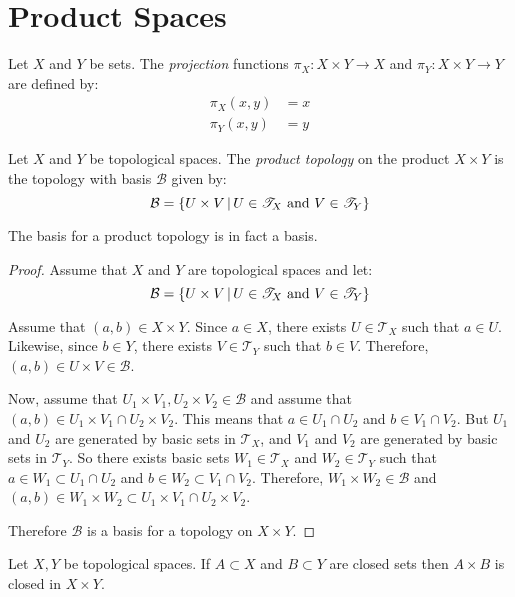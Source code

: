 \documentclass[letterpaper,12pt,fleqn]{article}
\newcommand{\p}{\pi}
\newcommand{\B}{\mathcal{B}}
\newcommand{\T}{\mathscr{T}}
\begin{document}
\section*{Product Spaces}

\begin{definition}[Projection]
  Let \(X\) and \(Y\) be sets.  The \emph{projection} functions \(\p_X:X\times Y\to X\) and \(\p_Y:X\times Y\to Y\)
  are defined by:
  \begin{align*}
    \p_X(x,y) &= x \\
    \p_Y(x,y) &= y
  \end{align*}
\end{definition}

\begin{definition}
  Let \(X\) and \(Y\) be topological spaces.  The \emph{product topology} on the product \(X\times Y\) is the
  topology with basis \(\B\) given by:
  \[\B=\setb{U\times V}{U\in\T_X\ \text{and}\ V\in\T_Y}\]
\end{definition}

\begin{theorem}
  The basis for a product topology is in fact a basis.
\end{theorem}

\begin{proof}
  Assume that \(X\) and \(Y\) are topological spaces and let:
  \[\B=\setb{U\times V}{U\in\T_X\ \text{and}\ V\in\T_Y}\]

  Assume that \((a,b)\in X\times Y\).  Since \(a\in X\), there exists \(U\in\T_X\) such that \(a\in U\).  Likewise,
  since \(b\in Y\), there exists \(V\in\T_Y\) such that \(b\in V\).  Therefore, \((a,b)\in U\times V\in\B\).

  Now, assume that \(U_1\times V_1,U_2\times V_2\in\B\) and assume that \((a,b)\in U_1\times V_1\cap U_2\times V_2\).
  This means that \(a\in U_1\cap U_2\) and \(b\in V_1\cap V_2\).  But \(U_1\) and \(U_2\) are generated by basic
  sets in \(\T_X\), and \(V_1\) and \(V_2\) are generated by basic sets in \(\T_Y\).  So there exists basic sets
  \(W_1\in\T_X\) and \(W_2\in\T_Y\) such that \(a\in W_1\subset U_1\cap U_2\) and \(b\in W_2\subset V_1\cap V_2\).
  Therefore, \(W_1\times W_2\in\B\) and \((a,b)\in W_1\times W_2\subset U_1\times V_1\cap U_2\times V_2\).

  Therefore \(\B\) is a basis for a topology on \(X\times Y\).
\end{proof}

\begin{theorem}
  Let \(X,Y\) be topological spaces.  If \(A\subset X\) and \(B\subset Y\) are closed sets then \(A\times B\)
  is closed in \(X\times Y\).
\end{theorem}
\end{document}
